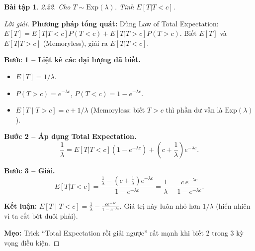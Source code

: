 \documentclass[8pt,a4paper]{article}
\newtheorem{exercise}{Bài tập}
\newenvironment{solution}{\begin{proof}[Lời giải]}{\end{proof}}
\begin{document}
\begin{exercise}
2.22. Cho $T \sim \text{Exp}(\lambda)$. Tính $E[T|T < c]$.
\end{exercise}
\begin{solution}
\textbf{Phương pháp tổng quát:} Dùng Law of Total Expectation: $E[T] = E[T|T<c]P(T<c) + E[T|T>c]P(T>c)$. Biết $E[T]$ và $E[T|T>c]$ (Memoryless), giải ra $E[T|T<c]$.

\textbf{Bước 1 -- Liệt kê các đại lượng đã biết.}
\begin{itemize}[nosep]
  \item $E[T] = 1/\lambda$.
  \item $P(T > c) = e^{-\lambda c}$, $P(T < c) = 1 - e^{-\lambda c}$.
  \item $E[T \mid T > c] = c + 1/\lambda$ (Memoryless: biết $T > c$ thì phần dư vẫn là $\text{Exp}(\lambda)$).
\end{itemize}

\textbf{Bước 2 -- Áp dụng Total Expectation.}
\[
  \frac{1}{\lambda} = E[T|T<c](1-e^{-\lambda c}) + \left(c + \frac{1}{\lambda}\right)e^{-\lambda c}.
\]

\textbf{Bước 3 -- Giải.}
\[
  E[T|T<c] = \frac{\frac{1}{\lambda} - \left(c + \frac{1}{\lambda}\right)e^{-\lambda c}}{1 - e^{-\lambda c}} = \boxed{\frac{1}{\lambda} - \frac{c \, e^{-\lambda c}}{1 - e^{-\lambda c}}}.
\]

\textbf{Kết luận:} $E[T \mid T < c] = \frac{1}{\lambda} - \frac{ce^{-\lambda c}}{1-e^{-\lambda c}}$. Giá trị này luôn nhỏ hơn $1/\lambda$ (hiển nhiên vì ta cắt bớt đuôi phải).

\textbf{Mẹo:} Trick ``Total Expectation rồi giải ngược'' rất mạnh khi biết 2 trong 3 kỳ vọng điều kiện.
\end{solution}
\end{document}
